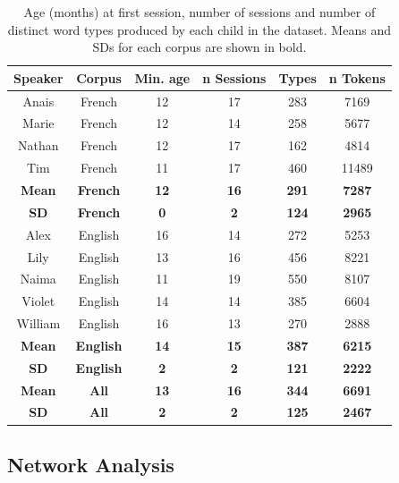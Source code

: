 \documentclass[
  man]{apa6}
\begin{document}
\begin{longtable}[t]{cccccc}
\caption{\label{tab:table-data-overview}Age (months) at first session, number of sessions and number of distinct word types produced by each child in the dataset. Means and SDs for each corpus are shown in bold.}\\
\toprule
Speaker & Corpus & Min. age & n Sessions & Types & n Tokens\\
\midrule
Anais & French & 12 & 17 & 283 & 7169\\
Marie & French & 12 & 14 & 258 & 5677\\
Nathan & French & 12 & 17 & 162 & 4814\\
Tim & French & 11 & 17 & 460 & 11489\\
\midrule
\textbf{Mean} & \textbf{French} & \textbf{12} & \textbf{16} & \textbf{291} & \textbf{7287}\\
\addlinespace
\textbf{SD} & \textbf{French} & \textbf{0} & \textbf{2} & \textbf{124} & \textbf{2965}\\
\midrule
Alex & English & 16 & 14 & 272 & 5253\\
Lily & English & 13 & 16 & 456 & 8221\\
Naima & English & 11 & 19 & 550 & 8107\\
Violet & English & 14 & 14 & 385 & 6604\\
\addlinespace
William & English & 16 & 13 & 270 & 2888\\
\midrule
\textbf{Mean} & \textbf{English} & \textbf{14} & \textbf{15} & \textbf{387} & \textbf{6215}\\
\textbf{SD} & \textbf{English} & \textbf{2} & \textbf{2} & \textbf{121} & \textbf{2222}\\
\midrule
\textbf{Mean} & \textbf{All} & \textbf{13} & \textbf{16} & \textbf{344} & \textbf{6691}\\
\textbf{SD} & \textbf{All} & \textbf{2} & \textbf{2} & \textbf{125} & \textbf{2467}\\
\bottomrule
\end{longtable}

\hypertarget{network-analysis}{%
\subsection{Network Analysis}\label{network-analysis}}
\end{document}
